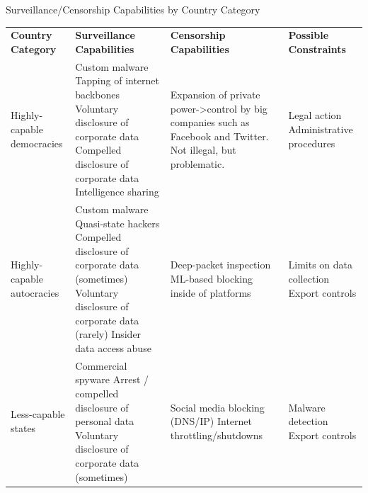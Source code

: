 \documentclass[nobackground,dvipsnames,table]{beamer}
\begin{document}
\begin{frame}{Surveillance/Censorship Capabilities by Country Category}
    \footnotesize %
    \begin{tabularx}{\textwidth}{|X|X|X|X|}
        \hline
        \textbf{Country Category} & \textbf{Surveillance Capabilities} & \textbf{Censorship Capabilities} & \textbf{Possible Constraints}\\
        Highly-capable democracies & Custom malware Tapping of internet backbones Voluntary disclosure of corporate data Compelled disclosure of corporate data Intelligence sharing & Expansion of private power->control by big companies such as Facebook and Twitter. Not illegal, but problematic. & Legal action Administrative procedures\\
        \hline
        \hline
        Highly-capable autocracies & Custom malware Quasi-state hackers Compelled disclosure of corporate data (sometimes) Voluntary disclosure of corporate data (rarely) Insider data access abuse & Deep-packet inspection ML-based blocking inside of platforms & Limits on data collection Export controls\\
        \hline
        Less-capable states & Commercial spyware Arrest / compelled disclosure of personal data Voluntary disclosure of corporate data (sometimes) & Social media blocking (DNS/IP) Internet throttling/shutdowns & Malware detection Export controls\\
        \hline
    \end{tabularx}
\end{frame}
\end{document}
